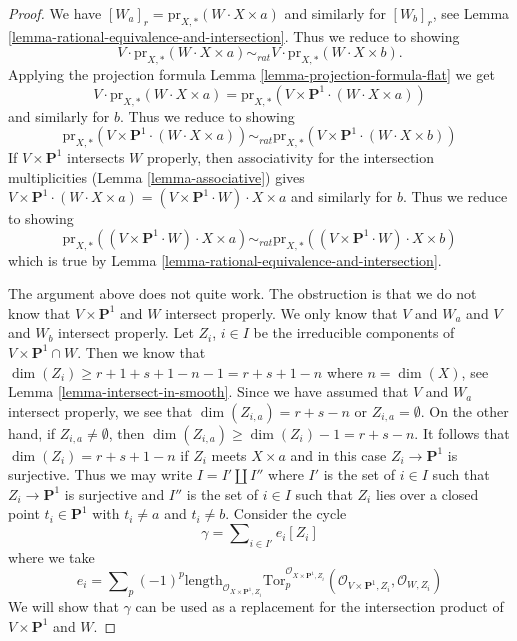 \documentclass{stacks-project}
\theoremstyle{plain}
\theoremstyle{definition}
\theoremstyle{remark}
\numberwithin{equation}{subsection}
\begin{document}
\begin{proof}
We have $[W_a]_r = \text{pr}_{X,*}(W \cdot X \times a)$ and similarly for
$[W_b]_r$, see Lemma \ref{lemma-rational-equivalence-and-intersection}.
Thus we reduce to showing
$$
V \cdot \text{pr}_{X,*}( W \cdot X \times a) \sim_{rat} V \cdot
\text{pr}_{X,*}( W \cdot X\times b).
$$
Applying the projection formula
Lemma \ref{lemma-projection-formula-flat} we get
$$
V \cdot \text{pr}_{X,*}( W \cdot X\times a) =
\text{pr}_{X,*}(V \times \mathbf{P}^1 \cdot (W \cdot X\times a))
$$
and similarly for $b$. Thus we reduce to showing
$$
\text{pr}_{X,*}(V \times \mathbf{P}^1 \cdot (W \cdot X\times a))
\sim_{rat}
\text{pr}_{X,*}(V \times \mathbf{P}^1 \cdot (W \cdot X\times b))
$$
If $V \times \mathbf{P}^1$ intersects $W$ properly, then
associativity for the intersection multiplicities
(Lemma \ref{lemma-associative})
gives $V \times \mathbf{P}^1 \cdot (W \cdot X\times a) =
(V \times \mathbf{P}^1 \cdot W) \cdot X \times a$
and similarly for $b$.  Thus we reduce to showing
$$
\text{pr}_{X,*}((V \times \mathbf{P}^1 \cdot W) \cdot X\times a)
\sim_{rat}
\text{pr}_{X,*}((V \times \mathbf{P}^1 \cdot W) \cdot X\times b)
$$
which is true by Lemma \ref{lemma-rational-equivalence-and-intersection}.

\medskip\noindent
The argument above does not quite work. The obstruction is that
we do not know that $V \times \mathbf{P}^1$ and $W$ intersect properly.
We only know that $V$ and $W_a$ and $V$ and $W_b$ intersect properly.
Let $Z_i$, $i \in I$ be the irreducible components of
$V \times \mathbf{P}^1 \cap W$. Then we know that
$\dim(Z_i) \geq r + 1 + s + 1 - n - 1 = r + s + 1 - n$ where $n = \dim(X)$, see
Lemma \ref{lemma-intersect-in-smooth}. Since we have assumed
that $V$ and $W_a$ intersect properly, we see that
$\dim(Z_{i, a}) = r + s - n$ or $Z_{i, a} = \emptyset$.
On the other hand, if $Z_{i, a} \not = \emptyset$, then
$\dim(Z_{i, a}) \geq \dim(Z_i) - 1 = r + s - n$.
It follows that $\dim(Z_i) = r + s + 1 - n$ if $Z_i$ meets $X \times a$
and in this case $Z_i \to \mathbf{P}^1$ is surjective.
Thus we may write $I = I' \amalg I''$ where $I'$ is the set of $i \in I$
such that $Z_i \to \mathbf{P}^1$ is surjective and $I''$ is the set of
$i \in I$ such that $Z_i$ lies over a closed point $t_i \in \mathbf{P}^1$
with $t_i \not = a$ and $t_i \not = b$. Consider the cycle
$$
\gamma = \sum\nolimits_{i \in I'} e_i [Z_i]
$$
where we take
$$
e_i = \sum\nolimits_p (-1)^p
\text{length}_{\mathcal{O}_{X \times \mathbf{P}^1, Z_i}}
\text{Tor}_p^{\mathcal{O}_{X \times \mathbf{P}^1, Z_i}}(
\mathcal{O}_{V \times \mathbf{P}^1, Z_i}, \mathcal{O}_{W, Z_i})
$$
We will show that $\gamma$ can be used as a replacement for
the intersection product of $V \times \mathbf{P}^1$ and $W$.


\end{proof}
\end{document}
